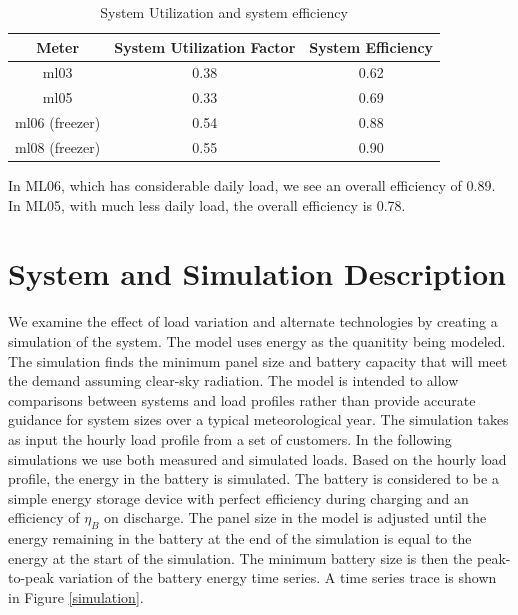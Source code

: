 \documentclass[conference]{IEEEtran}
\begin{document}
\begin{table}
\centering
\begin{tabular}{c c c}
Meter & System Utilization Factor & System Efficiency \\
\hline
ml03 & 0.38 & 0.62 \\
ml05 & 0.33 & 0.69 \\
ml06 (freezer) & 0.54 & 0.88 \\
ml08 (freezer) & 0.55 & 0.90 \\
\end{tabular}
\caption{System Utilization and system efficiency}
\label{efficiency}
\end{table}

In ML06, which has considerable daily load, we see an overall
efficiency of 0.89.
In ML05, with much less daily load, the overall efficiency
is 0.78.

\section{System and Simulation Description}

We examine the effect of load variation and alternate technologies
by creating a simulation of the system.
The model uses energy as the quanitity being modeled.
The simulation finds the minimum panel size and battery capacity
that will meet the demand assuming clear-sky radiation.
The model is intended to allow comparisons between systems and
load profiles rather than provide accurate guidance for system
sizes over a typical meteorological year.
The simulation takes as input the hourly load profile from a
set of customers.
In the following simulations we use both measured and simulated
loads.
Based on the hourly load profile, the energy in the battery
is simulated.
The battery is considered to be a simple energy storage device
with perfect efficiency during charging and an efficiency of
$\eta_B$ on discharge.
The panel size in the model is adjusted until the energy remaining
in the battery at the end of the simulation is equal to the
energy at the start of the simulation.
The minimum battery size is then the peak-to-peak variation
of the battery energy time series.
A time series trace is shown in Figure \ref{simulation}.
\end{document}
